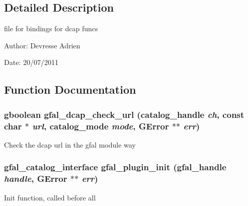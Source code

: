\subsection{Detailed Description}
file for bindings for dcap funcs 

\begin{Desc}
\item[Author:]Devresse Adrien \end{Desc}
\begin{Desc}
\item[Date:]20/07/2011 \end{Desc}


\subsection{Function Documentation}
\subsubsection{\setlength{\rightskip}{0pt plus 5cm}gboolean gfal\_\-dcap\_\-check\_\-url (catalog\_\-handle {\em ch}, const char $\ast$ {\em url}, catalog\_\-mode {\em mode}, GError $\ast$$\ast$ {\em err})}\label{gfal__dcap__plugin__main_8c_c323af210af0fad41d25089166cc5edd}


Check the dcap url in the gfal module way 
\subsubsection{\setlength{\rightskip}{0pt plus 5cm}\bf{gfal\_\-catalog\_\-interface} gfal\_\-plugin\_\-init (gfal\_\-handle {\em handle}, GError $\ast$$\ast$ {\em err})}\label{gfal__dcap__plugin__main_8c_5c9edde4d67d96432a319d940a4799f1}


Init function, called before all 